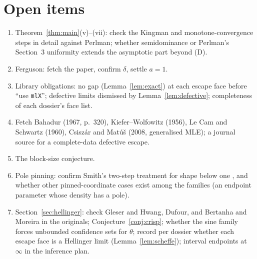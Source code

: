 \documentclass[11pt]{article}
\theoremstyle{definition}
\theoremstyle{remark}
\begin{document}
\section{Open items}
\begin{enumerate}
\item Theorem~\ref{thm:main}(v)--(vii): check the Kingman and
  monotone-convergence steps in detail against Perlman; whether
  semidominance or Perlman's Section~3 uniformity extends the asymptotic
  part beyond (D).
\item Ferguson: fetch the paper, confirm $\delta$, settle $a=1$.
\item Library obligations: no gap (Lemma~\ref{lem:exact}) at each escape
  face before ``use \texttt{mlX}''; defective limits dismissed by
  Lemma~\ref{lem:defective}; completeness of each dossier's face list.
\item Fetch Bahadur (1967, p.~320), Kiefer--Wolfowitz (1956), Le Cam and
  Schwartz (1960), Csisz\'ar and Mat\'u\v s (2008, generalised MLE); a
  journal source for a complete-data defective escape.
\item The block-size conjecture.
\item Pole pinning: confirm Smith's two-step treatment for shape below one
  \cite{smith}, and whether other pinned-coordinate cases exist among the
  families (an endpoint parameter whose density has a pole).
\item Section~\ref{sec:hellinger}: check Gleser and Hwang, Dufour, and
  Bertanha and Moreira in the originals; Conjecture~\ref{conj:crisp};
  whether the sine family forces unbounded confidence sets for $\theta$;
  record per dossier whether each escape face is a Hellinger limit
  (Lemma~\ref{lem:scheffe}); interval endpoints at $\infty$ in the
  inference plan.
\end{enumerate}
\end{document}
